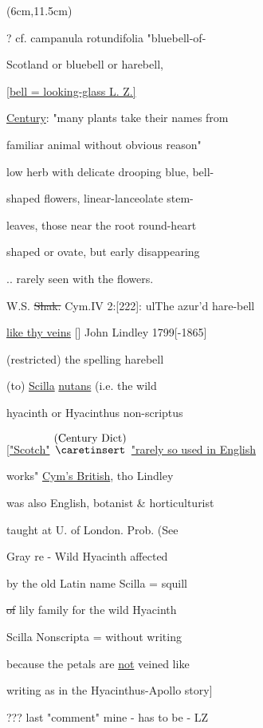 \documentclass[a4paper]{article}
\begin{document}
\begin{textblock*}{8cm}(6cm,11.5cm)%
	\begin{minipage}{8cm} 
        \color{red}
        ? cf. campanula rotundifolia "bluebell-of-\par
        Scotland or bluebell or harebell,\par
        
        \ul{[bell = looking-glass L. Z.]}\par
        \setul{}{0.5pt}
        \ul{Century}:
        "many plants take their names from\par
        familiar animal %
        without obvious reason"\par
        low herb with delicate drooping blue, bell-\par
        shaped flowers, linear-lanceolate stem-\par
        leaves, those near the root round-heart\par
        shaped or ovate, but early disappearing\par
        .. rarely seen with the flowers.\par
        W.S. \sout{Shak.} Cym.IV 2:[222]: ul{The azur'd hare-bell}\par
        \ul{like thy veins} [] John Lindley 1799[-1865]\par
        (restricted) the spelling harebell\par
        (to) \ul{Scilla} \ul{nutans} (i.e. the wild\par
        hyacinth or Hyacinthus non-scriptus\par
        \ul{
            ["Scotch"} 
        \color{blue}
        $\stackrel{\hbox{(Century Dict)}}{\hbox{$\caretinsert$}}$
        \color{red}
        \ul{"rarely so used in English}\par
        works" \ul{Cym's British}, tho Lindley\par
        was also English, botanist \& horticulturist\par
        taught at U. of London. Prob. (See\par
        Gray re - Wild Hyacinth affected\par
        by the old Latin name Scilla = squill\par
        \sout{of} lily family for the wild Hyacinth\par
        Scilla Nonscripta = without writing\par
        because the petals are \ul{not} veined like\par
        writing as in the Hyacinthus-Apollo story]\par
        \color{blue}
        ??? last "comment" mine
        - has to be - LZ	
	\end{minipage}%
\end{textblock*}%
\end{document}
